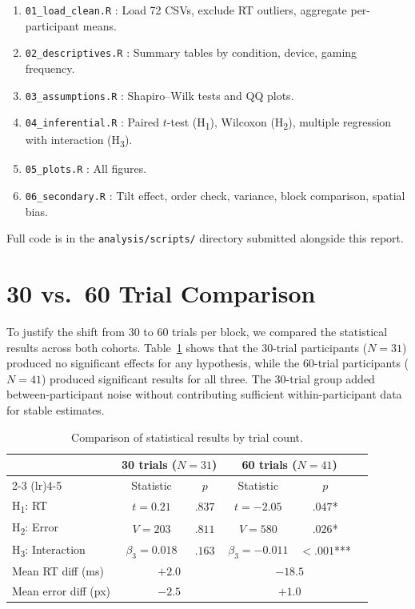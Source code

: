 \documentclass[12pt,letterpaper]{article}
\begin{document}
\begin{enumerate}
  \item \texttt{01\_load\_clean.R} : Load 72 CSVs, exclude RT outliers, aggregate per-participant means.
  \item \texttt{02\_descriptives.R} : Summary tables by condition, device, gaming frequency.
  \item \texttt{03\_assumptions.R} : Shapiro--Wilk tests and QQ plots.
  \item \texttt{04\_inferential.R} : Paired $t$-test (H\textsubscript{1}), Wilcoxon (H\textsubscript{2}), multiple regression with interaction (H\textsubscript{3}).
  \item \texttt{05\_plots.R} : All figures.
  \item \texttt{06\_secondary.R} : Tilt effect, order check, variance, block comparison, spatial bias.
\end{enumerate}

Full code is in the \texttt{analysis/scripts/} directory submitted alongside this report.


\section{30 vs.\ 60 Trial Comparison}
\label{app:30v60}

To justify the shift from 30 to 60 trials per block, we compared the statistical results across both cohorts. Table~\ref{tab:30v60} shows that the 30-trial participants ($N = 31$) produced no significant effects for any hypothesis, while the 60-trial participants ($N = 41$) produced significant results for all three. The 30-trial group added between-participant noise without contributing sufficient within-participant data for stable estimates.

\begin{table}[H]
\centering
\caption{Comparison of statistical results by trial count.}
\label{tab:30v60}
\begin{tabular}{lccccc}
\toprule
& \multicolumn{2}{c}{\textbf{30 trials ($N=31$)}} & \multicolumn{2}{c}{\textbf{60 trials ($N=41$)}} \\
\cmidrule(lr){2-3} \cmidrule(lr){4-5}
& Statistic & $p$ & Statistic & $p$ \\
\midrule
H\textsubscript{1}: RT & $t = 0.21$ & $.837$ & $t = -2.05$ & $.047$* \\
H\textsubscript{2}: Error & $V = 203$ & $.811$ & $V = 580$ & $.026$* \\
H\textsubscript{3}: Interaction & $\beta_3 = 0.018$ & $.163$ & $\beta_3 = -0.011$ & $<.001$*** \\
\midrule
Mean RT diff (ms) & \multicolumn{2}{c}{$+2.0$} & \multicolumn{2}{c}{$-18.5$} \\
Mean error diff (px) & \multicolumn{2}{c}{$-2.5$} & \multicolumn{2}{c}{$+1.0$} \\
\bottomrule
\end{tabular}
\end{table}
\end{document}
